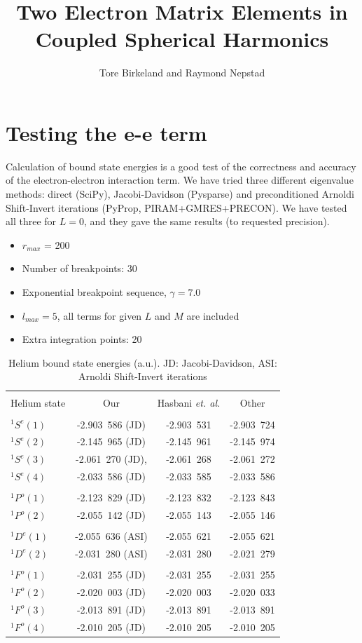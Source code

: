 \documentclass[a4paper,12pt]{article}
\title{Two Electron Matrix Elements in Coupled Spherical Harmonics}
\author{Tore Birkeland and Raymond Nepstad}
\begin{document}
\section{Testing the e-e term}
Calculation of bound state energies is a good test of the correctness and accuracy of the electron-electron interaction term. We have tried three different eigenvalue methods: direct (SciPy), Jacobi-Davidson (Pysparse) and preconditioned Arnoldi Shift-Invert iterations (PyProp, PIRAM+GMRES+PRECON). We have tested all three for $L=0$, and they gave the same results (to requested precision).

\begin{itemize}
	\item $r_{max}$ = 200
	\item Number of breakpoints: 30
	\item Exponential breakpoint sequence, $\gamma = 7.0$
	\item $l_{max} = 5$, all terms for given $L$ and $M$ are included
	\item Extra integration points: 20
\end{itemize}

\begin{table}
\centering
\begin{tabular}{lccc}
	\hline\\
	Helium state & Our & Hasbani \textit{et. al.} & Other\\
	\hline\\
	$^1S^e(1)$ & -2.903\ 586 (JD) & -2.903\ 531 & -2.903\ 724\\
	$^1S^e(2)$ & -2.145\ 965 (JD) & -2.145\ 961 & -2.145\ 974\\
	$^1S^e(3)$ & -2.061\ 270 (JD), & -2.061\ 268 & -2.061\ 272\\
	$^1S^e(4)$ & -2.033\ 586 (JD) & -2.033\ 585 & -2.033\ 586\\
	\\
	$^1P^o(1)$ & -2.123\ 829 (JD) & -2.123\ 832 & -2.123\ 843\\
	$^1P^o(2)$ & -2.055\ 142 (JD) & -2.055\ 143 & -2.055\ 146\\
	\\
	$^1D^e(1)$ & -2.055\ 636 (ASI) & -2.055\ 621 & -2.055\ 621\\
	$^1D^e(2)$ & -2.031\ 280 (ASI) & -2.031\ 280 & -2.021\ 279\\
	\\
	$^1F^o(1)$ & -2.031\ 255 (JD) & -2.031\ 255 & -2.031\ 255\\
	$^1F^o(2)$ & -2.020\ 003 (JD)& -2.020\ 003 & -2.020\ 033\\
	$^1F^o(3)$ & -2.013\ 891 (JD) & -2.013\ 891 & -2.013\ 891\\
	$^1F^o(4)$ & -2.010\ 205 (JD) & -2.010\ 205 & -2.010\ 205\\
\end{tabular}
\caption{Helium bound state energies (a.u.). JD: Jacobi-Davidson, ASI: Arnoldi Shift-Invert iterations}
\label{tab:}
\end{table}
\end{document}
